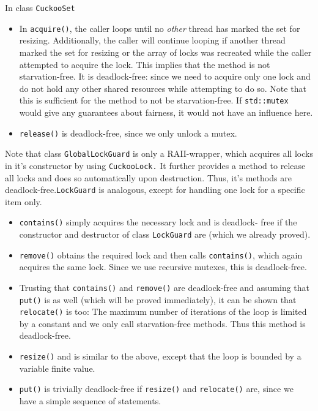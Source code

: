 \documentclass[a4paper,10pt]{article}
\begin{document}
In class \lstinline|CuckooSet|
\begin{itemize}
\item In \lstinline|acquire()|, the caller loops until no \textit{other} thread
    has marked the set for resizing. Additionally, the caller will continue
    looping if another thread marked the set for resizing or the array of locks
    was recreated while the caller attempted to acquire the lock. This implies
    that the method is not starvation-free. It is deadlock-free: since we need
    to acquire only one lock and do not hold any other shared resources while
    attempting to do so. Note that this is sufficient for the method to not be
    starvation-free. If \lstinline|std::mutex| would  give any guarantees about
    fairness, it would not have an influence here. 
\item \lstinline|release()| is deadlock-free, since we only unlock a mutex.
\end{itemize}
Note that class \lstinline|GlobalLockGuard| is only a RAII-wrapper, which
acquires all locks in it's constructor by using \lstinline|CuckooLock.| It
further provides a method to release all locks and does so automatically upon
destruction. Thus, it's methods are deadlock-free.\lstinline|LockGuard| is
analogous, except for handling one lock for a specific item only. 

\begin{itemize}
\item \lstinline|contains()| simply acquires the necessary lock and is
    deadlock- free if the constructor and destructor of class
    \lstinline|LockGuard| are (which we already proved).
\item \lstinline|remove()| obtains the required lock and then calls
    \lstinline|contains()|, which again acquires the same lock. Since we use
    recursive mutexes, this is deadlock-free. 
\item Trusting that \lstinline|contains()| and \lstinline|remove()| are
    deadlock-free and assuming that \lstinline|put()| is as well (which will be
    proved immediately), it can be shown that \lstinline|relocate()| is too:
    The maximum number of iterations of the loop is limited by a constant and
    we only call starvation-free methods. Thus this method is deadlock-free.
\item \lstinline|resize()| and is similar to the above, except that the loop is
    bounded by a variable finite value.
\item \lstinline|put()| is trivially deadlock-free if \lstinline|resize()| and
    \lstinline|relocate()| are, since we have a simple sequence of statements. 
\end{itemize}
\end{document}
